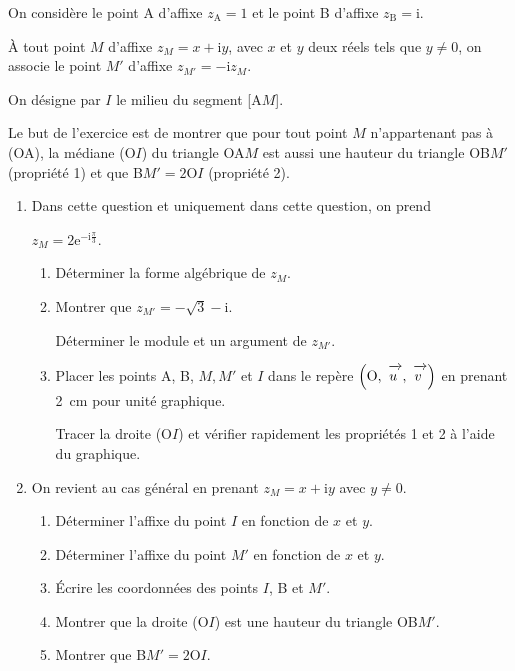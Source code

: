 \documentclass[10pt]{article}
\newcommand{\vect}[1]{\mathchoice%
{\overrightarrow{\displaystyle\mathstrut#1\,\,}}%
{\overrightarrow{\textstyle\mathstrut#1\,\,}}%
{\overrightarrow{\scriptstyle\mathstrut#1\,\,}}%
{\overrightarrow{\scriptscriptstyle\mathstrut#1\,\,}}}
\def\Ouv{$\left(\text{O},~\vect{u},~\vect{v}\right)$}
\begin{document}
On considère le point A d'affixe $z_{\text{A}} = 1$ et le point B d'affixe $z_{\text{B}} = \text{i}$.
 
À tout point $M$ d'affixe $z_{M} = x + \text{i}y$, avec $x$ et $y$ deux réels tels que $y \neq 0$, on associe le point $M'$ d'affixe $z_{M'} = - \text{i}z_{M}$.
 
On désigne par $I$ le milieu du segment [A$M$].
 
Le but de l'exercice est de montrer que pour tout point $M$ n'appartenant pas à (OA), la médiane (O$I$) du triangle OA$M$ est aussi une hauteur du triangle OB$M'$ (propriété 1) et que B$M' = 2 \text{O}I$ (propriété 2). 

\medskip
 
\begin{enumerate}
\item Dans cette question et uniquement dans cette question, on prend 

$z_{M} = 2\text{e}^{- \text{i}\frac{\pi}{3}}$. 
	\begin{enumerate}
		\item Déterminer la forme algébrique de $z_{M}$. 
		\item Montrer que $z_{M'} = - \sqrt{3} - \text{i}$.
		
Déterminer le module et un argument de $z_{M'}$. 
		\item Placer les points A, B, $M, M'$ et $I$ dans le repère \Ouv{ }en prenant 2~cm pour unité graphique.
		 
Tracer la droite (O$I$) et vérifier rapidement les propriétés 1 et 2 à l'aide du graphique.
	\end{enumerate} 
\item On revient au cas général en prenant $z_{M} = x + \text{i}y$ avec $y \neq 0$. 
	\begin{enumerate}
		\item Déterminer l'affixe du point $I$ en fonction de $x$ et $y$. 
		\item Déterminer l'affixe du point $M'$ en fonction de $x$ et $y$. 
		\item Écrire les coordonnées des points $I$, B et $M'$. 
		\item Montrer que la droite (O$I$) est une hauteur du triangle OB$M'$. 
		\item Montrer que B$M' = 2 \text{O}I$.
	\end{enumerate} 
\end{enumerate}

\vspace{0,5cm}
\end{document}
